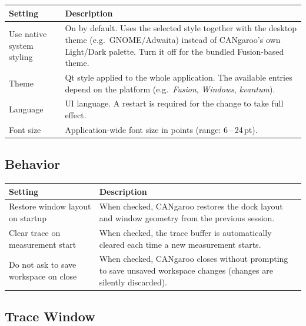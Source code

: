\documentclass[a4paper,11pt]{article}
\begin{document}
\begin{table}[h]
  \centering
  \begin{tabularx}{\textwidth}{lX}
    \toprule
    \textbf{Setting} & \textbf{Description} \\
    \midrule
    Use native system styling
              & On by default. Uses the selected style together with the desktop
                theme (e.g.\ GNOME/Adwaita) instead of CANgaroo's own Light/Dark
                palette. Turn it off for the bundled Fusion-based theme. \\
    Theme     & Qt style applied to the whole application.
                The available entries depend on the platform
                (e.g.\ \textit{Fusion}, \textit{Windows}, \textit{kvantum}). \\
    Language  & UI language. A restart is required for the change to take full
                effect. \\
    Font size & Application-wide font size in points (range: 6\,--\,24\,pt). \\
    \bottomrule
  \end{tabularx}
\end{table}

\subsection*{Behavior}

\begin{table}[h]
  \centering
  \begin{tabularx}{\textwidth}{lX}
    \toprule
    \textbf{Setting} & \textbf{Description} \\
    \midrule
    Restore window layout on startup
      & When checked, CANgaroo restores the dock layout and window
        geometry from the previous session. \\
    Clear trace on measurement start
      & When checked, the trace buffer is automatically cleared each time
        a new measurement starts. \\
    Do not ask to save workspace on close
      & When checked, CANgaroo closes without prompting to save unsaved
        workspace changes (changes are silently discarded). \\
    \bottomrule
  \end{tabularx}
\end{table}

\subsection*{Trace Window}
\end{document}
